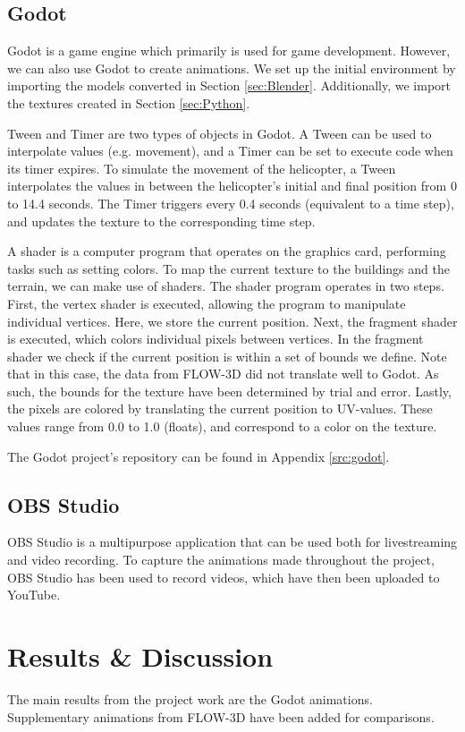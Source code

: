 \documentclass[a4paper,11pt]{extarticle}
\begin{document}
\subsection{Godot}
Godot \citep{godot} is a game engine which primarily is used for game development. However, we can also use Godot to create animations. We set up the initial environment by importing the models converted in Section \ref{sec:Blender}. Additionally, we import the textures created in Section \ref{sec:Python}.

Tween \citep{godot:tween} and Timer \citep{godot:timer} are two types of objects in Godot. A Tween can be used to interpolate values (e.g. movement), and a Timer can be set to execute code when its timer expires. To simulate the movement of the helicopter, a Tween interpolates the values in between the helicopter's initial and final position from 0 to 14.4 seconds. The Timer triggers every 0.4 seconds (equivalent to a time step), and updates the texture to the corresponding time step.

A shader \citep{godot:shader} is a computer program that operates on the graphics card, performing tasks such as setting colors. To map the current texture to the buildings and the terrain, we can make use of shaders. The shader program operates in two steps. First, the vertex shader is executed, allowing the program to manipulate individual vertices. Here, we store the current position. Next, the fragment shader is executed, which colors individual pixels between vertices. In the fragment shader we check if the current position is within a set of bounds we define. Note that in this case, the data from FLOW-3D did not translate well to Godot. As such, the bounds for the texture have been determined by trial and error. Lastly, the pixels are colored by translating the current position to UV-values. These values range from 0.0 to 1.0 (floats), and correspond to a color on the texture.

The Godot project's repository can be found in Appendix \ref{src:godot}.

\subsection{OBS Studio}
OBS Studio \citep{obs} is a multipurpose application that can be used both for livestreaming and video recording. To capture the animations made throughout the project, OBS Studio has been used to record videos, which have then been uploaded to YouTube.

\section{Results \& Discussion}\label{sec:results}
The main results from the project work are the Godot animations. Supplementary animations from FLOW-3D have been added for comparisons.
\end{document}
